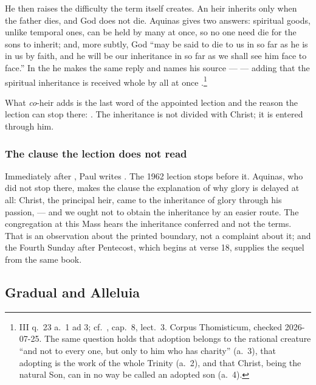He then raises the difficulty the term itself creates. An heir inherits only
when the father dies, and God does not die. Aquinas gives two answers:
spiritual goods, unlike temporal ones, can be held by many at once, so no one
need die for the sons to inherit; and, more subtly, God ``may be said to die to
us in so far as he is in us by faith, and he will be our inheritance in so far
as we shall see him face to face.'' In the  he makes the same reply
and names his source ---  --- adding that the spiritual inheritance is received whole
by all at once .\footnote{
 III q.\ 23 a.\ 1 ad 3; cf.\ , cap.\ 8, lect.\ 3.
Corpus Thomisticum, checked 2026-07-25. The same question holds that adoption
belongs to the rational creature ``and not to every one, but only to him who
has charity'' (a.\ 3), that adopting is the work of the whole Trinity (a.\ 2),
and that Christ, being the natural Son, can in no way be called an adopted son
(a.\ 4).}

What \emph{co}-heir adds is the last word of the appointed lection and the
reason the lection can stop there: . The inheritance is not
divided with Christ; it is entered through him.

\subsubsection*{The clause the lection does not read}

Immediately after , Paul writes . The 1962 lection stops before it. Aquinas,
who did not stop there, makes the clause the explanation of why glory is
delayed at all: Christ, the principal heir, came to the inheritance of glory
through his passion,  --- and we ought not to obtain the inheritance by an easier route.
The congregation at this Mass hears the inheritance conferred and not the
terms. That is an observation about the printed boundary, not a complaint about
it; and the Fourth Sunday after Pentecost, which begins at verse 18, supplies
the sequel from the same book.

\subsection{Gradual and Alleluia }

